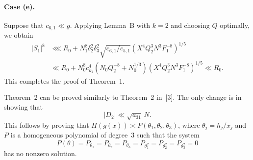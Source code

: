 \documentclass[10pt]{article}
\begin{document}
\paragraph{Case (e).}
Suppose that $c_{6,1}\ll g$. Applying Lemma~B with $k=2$ and choosing $Q$ optimally, we obtain
\[
\begin{aligned}
  |S_1|^8
  &\lll R_0+N_1^8\delta_2^2\delta_3^2
    \sqrt{c_{6,1}/c_{5,1}}
    (X^4Q_2^3N^3F_1^{-8})^{1/5}\\
  &\ll R_0+N_0^8c_{k_1}^4
    (N_0Q_2^{-8}+N_0^{1/3})
    (X^4Q_2^3N^3F_1^{-8})^{1/5}
  \ll R_0.
\end{aligned}
\]
This completes the proof of Theorem~1.

Theorem~2 can be proved similarly to Theorem~2 in~[3]. The only change is in showing that
\[
  |D_2|\ll\sqrt{a_{31}}\,N.
\]
This follows by proving that $H(g(x))\asymp P(\theta_1,\theta_2,\theta_3)$, where $\theta_j=h_j/x_j$ and $P$ is a homogeneous polynomial of degree~$3$ such that the system
\[
  P(\theta)=P_{\theta_1}=P_{\theta_2}=P_{\theta_3}
  =P_{\theta_1^2}=P_{\theta_2^2}=P_{\theta_3^2}=0
\]
has no nonzero solution.
\end{document}
